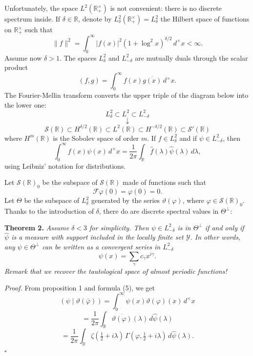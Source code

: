 \documentclass[12pt]{article}
\begin{document}
Unfortunately, the space $L^2(\mathbb{R}_+^{\times})$ is not convenient: there is no discrete spectrum inside. If $\delta \in \mathbb{R}$, denote by $L_{\delta}^2(\mathbb{R}_+^{\times}) = L_{\delta}^2$ the Hilbert space of functions on $\mathbb{R}_+^{\times}$ such that
\[
\|f\|^2 = \int_0^{\infty} |f(x)|^2 (1 + \log^2 x)^{\delta/2}\,d^{\times}x < \infty.
\]
Assume now $\delta > 1$. The spaces $L_{\delta}^2$ and $L_{-\delta}^2$ are mutually duals through the scalar product
\[
(f, g) = \int_0^{\infty} f(x) \overline{g(x)}\,d^{\times}x.
\]
The Fourier-Mellin transform converts the upper triple of the diagram below into the lower one:
\[
L_{\delta}^2 \subset L^2 \subset L_{-\delta}^2
\]
\[
\downarrow
\]
\[
\mathcal{S}(\mathbb{R}) \subset H^{\delta/2}(\mathbb{R}) \subset L^2(\mathbb{R}) \subset H^{-\delta/2}(\mathbb{R}) \subset \mathcal{S}'(\mathbb{R})
\]
where $H^m(\mathbb{R})$ is the Sobolev space of order $m$. If $f \in L_{\delta}^2$ and if $\psi \in L_{-\delta}^2$, then
\begin{equation}
\int_0^{\infty} f(x) \psi(x)\,d^{\times}x = \frac{1}{2\pi} \int_{\mathbb{R}} \hat{f}(\lambda) \hat{\psi}(\lambda)\,d\lambda,
\tag{5}
\end{equation}
using Leibniz' notation for distributions.

Let $\mathcal{S}(\mathbb{R})_0$ be the subspace of $\mathcal{S}(\mathbb{R})$ made of functions such that
\[
\mathcal{F}\varphi(0) = \varphi(0) = 0.
\]
Let $\Theta$ be the subspace of $L_{\delta}^2$ generated by the series $\vartheta(\varphi)$, where $\varphi \in \mathcal{S}(\mathbb{R})_0$. Thanks to the introduction of $\delta$, there do are discrete spectral values in $\Theta^{\perp}$:

\medskip

\noindent
\textbf{Theorem 2.} \emph{Assume $\delta < 3$ for simplicity. Then $\psi \in L_{-\delta}^2$ is in $\Theta^{\perp}$ if and only if $\hat{\psi}$ is a measure with support included in the locally finite set $\mathcal{Y}$. In other words, any $\psi \in \Theta^{\perp}$ can be written as a convergent series in $L_{-\delta}^2$}
\[
\psi(x) = \sum_{\gamma} c_{\gamma} x^{i\gamma}.
\]
\emph{Remark that we recover the tautological space of almost periodic functions!}

\medskip

\noindent
\emph{Proof.} From proposition 1 and formula (5), we get
\[
(\psi \mid \vartheta(\bar{\varphi})) = \int_0^{\infty} \psi(x) \vartheta(\varphi)(x)\,d^{\times}x
\]
\[
= \frac{1}{2\pi} \int_{\mathbb{R}} \overline{\vartheta(\varphi)}(\lambda)\,d\hat{\psi}(\lambda)
\]
\[
= \frac{1}{2\pi} \int_{\mathbb{R}} \zeta(\tfrac{1}{2} + i\lambda)\, \Gamma(\varphi, \tfrac{1}{2} + i\lambda)\,d\hat{\psi}(\lambda).
\]
$\square$
\end{document}
